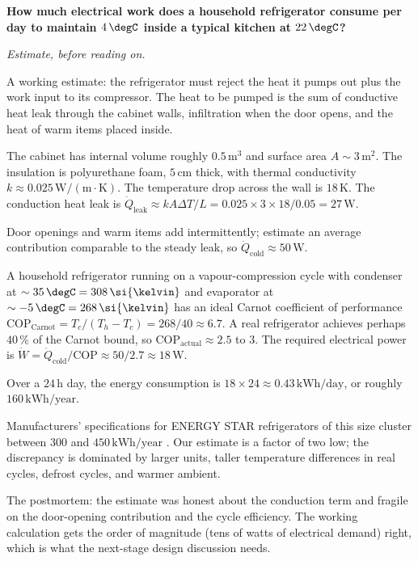 \begin{estimation}
\textbf{How much electrical work does a household refrigerator consume
per day to maintain $4\,\degC$ inside a typical kitchen at
$22\,\degC$?}

\smallskip
\textit{Estimate, before reading on.}

\smallskip
A working estimate: the refrigerator must reject the heat it pumps out
plus the work input to its compressor. The heat to be pumped is the
sum of conductive heat leak through the cabinet walls, infiltration
when the door opens, and the heat of warm items placed inside.

The cabinet has internal volume roughly $0.5\,\text{m}^3$ and surface
area $A \sim 3\,\text{m}^2$. The insulation is polyurethane foam, $5\,
\si{\centi\meter}$ thick, with thermal conductivity $k \approx
0.025\,\text{W}/(\text{m}\cdot\text{K})$. The temperature drop across
the wall is $18\,\si{\kelvin}$. The conduction heat leak is
$\dot{Q}_{\text{leak}} \approx k A \Delta T / L = 0.025 \times 3
\times 18 / 0.05 = 27\,\text{W}$.

Door openings and warm items add intermittently; estimate an average
contribution comparable to the steady leak, so $\dot{Q}_{\text{cold}}
\approx 50\,\text{W}$.

A household refrigerator running on a vapour-compression cycle with
condenser at $\sim 35\,\degC = 308\,\si{\kelvin}$ and evaporator at
$\sim -5\,\degC = 268\,\si{\kelvin}$ has an ideal Carnot coefficient of
performance $\text{COP}_{\text{Carnot}} = T_c/(T_h - T_c) = 268/40
\approx 6.7$. A real refrigerator achieves perhaps $40\,\%$ of the
Carnot bound, so $\text{COP}_{\text{actual}} \approx 2.5$ to $3$. The
required electrical power is $\dot{W} = \dot{Q}_{\text{cold}}/\text{COP}
\approx 50/2.7 \approx 18\,\text{W}$.

Over a $24\,\text{h}$ day, the energy consumption is $18 \times 24
\approx 0.43\,\text{kWh}/\text{day}$, or roughly $160\,\text{kWh}/
\text{year}$.

Manufacturers' specifications for ENERGY STAR refrigerators of this
size cluster between $300$ and $450\,\text{kWh}/\text{year}$
\cite{gen:mackay2009}. Our estimate is a factor of two low; the
discrepancy is dominated by larger units, taller temperature
differences in real cycles, defrost cycles, and warmer ambient.

The postmortem: the estimate was honest about the conduction term and
fragile on the door-opening contribution and the cycle efficiency. The
working calculation gets the order of magnitude (tens of watts of
electrical demand) right, which is what the next-stage design
discussion needs.
\end{estimation}

